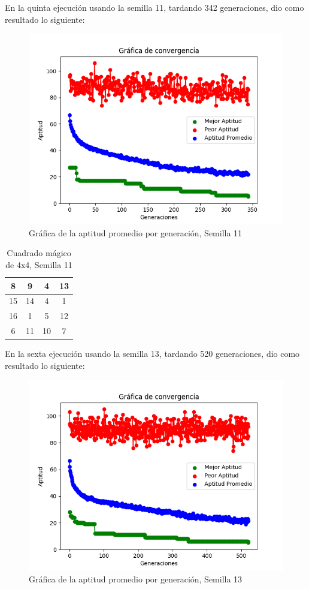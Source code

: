 \documentclass{report}
\begin{document}
    En la quinta ejecución usando la semilla 11, tardando 342 generaciones, dio como resultado lo siguiente:
    \begin{figure}[H]
        \centering
        \includegraphics[scale=0.5]{Grafica5_2.png}
        \caption{Gráfica de la aptitud promedio por generación, Semilla 11}
    \end{figure}
    \begin{table}[H]
        \centering
        \begin{tabular}{|c|c|c|c|}
            \hline
            8 & 9 & 4 & 13\\
            \hline
            15 & 14 & 4 & 1\\
            \hline
            16 & 1 & 5 & 12\\
            \hline
            6 & 11 & 10 & 7\\
            \hline
        \end{tabular}
        \caption{Cuadrado mágico de 4x4, Semilla 11}
    \end{table}
    En la sexta ejecución usando la semilla 13, tardando 520 generaciones, dio como resultado lo siguiente:
    \begin{figure}[H]
        \centering
        \includegraphics[scale=0.5]{Grafica6_2.png}
        \caption{Gráfica de la aptitud promedio por generación, Semilla 13}
    \end{figure}
\end{document}
